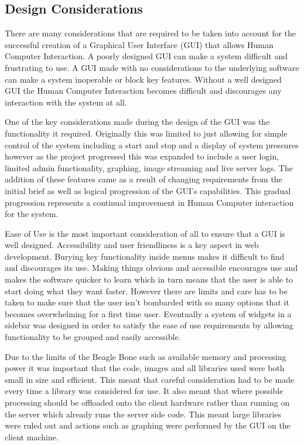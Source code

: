 \subsection{Design Considerations}

There are many considerations that are required to be taken into account for the successful creation of a Graphical User Interface (GUI) that allows Human Computer Interaction.  A poorly designed GUI can make a system difficult and frustrating to use. A GUI made with no considerations to the underlying software can make a system inoperable or block key features.  Without a well designed GUI the Human Computer Interaction becomes difficult and discourages any interaction with the system at all.

	One of the key considerations made during the design of the GUI was the functionality it required.  Originally this was limited to just allowing for simple control of the system including a start and stop and a display of system pressures however as the project progressed this was expanded to include a user login, limited admin functionality, graphing, image streaming and live server logs.  The addition of these features came as a result of changing requirements from the initial brief as well as logical progression of the GUI's capabilities.  This gradual progression represents a continual improvement in Human Computer interaction for the system.  

	Ease of Use is the most important consideration of all to ensure that a GUI is well designed.  Accessibility and user friendliness is a key aspect in web development.  Burying key functionality inside menus makes it difficult to find and discourages its use.   Making things obvious and accessible encourages use and makes the software quicker to learn which in turn means that the user is able to start doing what they want faster.  However there are limits and care has to be taken to make sure that the user isn't bombarded with so many options that it becomes overwhelming for a first time user.  Eventually a system of widgets in a sidebar was designed in order to satisfy the ease of use requirements by allowing functionality to be grouped and easily accessible.

	Due to the limits of the Beagle Bone such as available memory and processing power it was important that the code, images and all libraries used were both small in size and efficient.  This meant that careful consideration had to be made every time a library was considered for use.  It also meant that where possible processing should be offloaded onto the client hardware rather than running on the server which already runs the server side code.  This meant large libraries were ruled out and actions such as graphing were performed by the GUI on the client machine.

